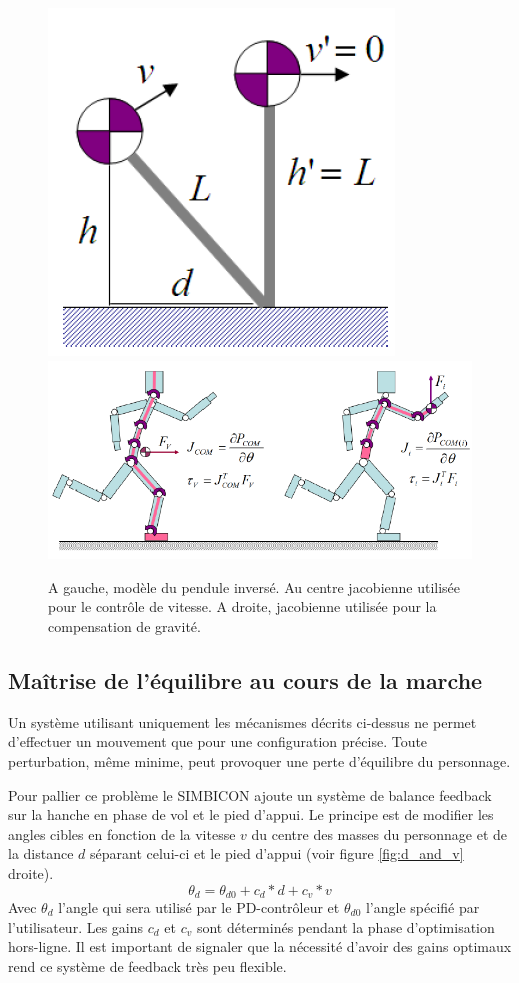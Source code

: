 \documentclass[runningheads,a4paper]{llncs}
\begin{document}
\begin{figure}[h]
\centering
\includegraphics[scale=0.5]{IPM.png}
\includegraphics[scale=0.5]{shema_jacobians.png}
\caption{A gauche, modèle du pendule inversé. Au centre jacobienne utilisée pour le contrôle de vitesse. A droite, jacobienne utilisée pour la compensation de gravité. \cite{coros2010generalized} }
\label{fig:ipm}
\label{fig:jacob}
\end{figure}

\subsection{Maîtrise de l'équilibre au cours de la marche}
\label{sec:previous_works_balance}

Un système utilisant uniquement les mécanismes décrits ci-dessus ne permet d'effectuer un mouvement que pour une configuration précise. Toute perturbation, même minime, peut provoquer une perte d'équilibre du personnage.

Pour pallier ce problème le SIMBICON ajoute un système de balance feedback sur la hanche en phase de vol et le pied d'appui. Le principe est de modifier les angles cibles en fonction de la vitesse $v$ du centre des masses du personnage et de la distance \(d\) séparant celui-ci et le pied d'appui (voir figure \ref{fig:d_and_v} droite). 
\[
\theta_d=\theta_{d0} + c_d*d + c_v*v 
\]
Avec \(\theta_d\) l'angle qui sera utilisé par le PD-contrôleur et \(\theta_{d0}\) l'angle spécifié par l'utilisateur.
Les gains \(c_d\) et \(c_v\) sont déterminés pendant la phase d'optimisation hors-ligne. Il est important de signaler que la nécessité d'avoir des gains optimaux rend ce système de feedback très peu flexible.
\end{document}
